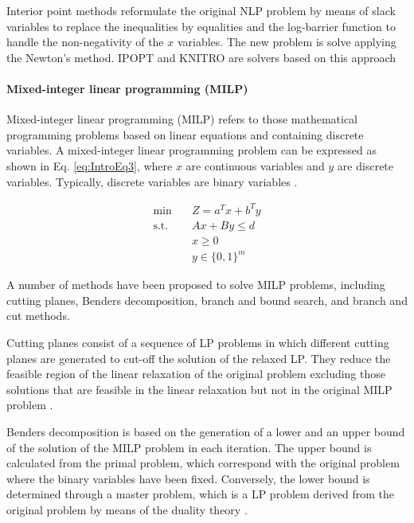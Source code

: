 \begin{refsection}[referencesCh1]
Interior point methods reformulate the original NLP problem by means of slack variables to replace the inequalities by equalities and the log-barrier function to handle the non-negativity of the $x$ variables. The new problem is solve applying the Newton's method. IPOPT \citep{wachter2006implementation} and KNITRO \citep{waltz2004knitro} are solvers based on this approach

\paragraph{Mixed-integer linear programming (MILP)}
Mixed-integer linear programming (MILP) refers to those mathematical programming problems based on linear equations and containing discrete variables. A mixed-integer linear programming problem can be expressed as shown in Eq. \ref{eq:IntroEq3}, where $x$ are continuous variables and $y$ are discrete variables. Typically, discrete variables are binary variables \citep{grossmann2021advanced}.

\begin{align}
		\min \quad & Z=a^{T}x + b^{T}y \nonumber\\
		\textrm{s.t.} \quad & Ax+By \leq d \label{eq:IntroEq3}\\
		& x \geq 0 \\
		& y \in \lbrace 0,1 \rbrace ^{m} \nonumber
\end{align}  

A number of methods have been proposed to solve MILP problems, including cutting planes, Benders decomposition, branch and bound search, and branch and cut methods.

Cutting planes consist of a sequence of LP problems in which different cutting planes are generated to cut-off the solution of the relaxed LP. They reduce the feasible region of the linear relaxation of the original problem excluding those solutions that are feasible in the linear relaxation but not in the original MILP problem \citep{floudas1995nonlinear}. 

Benders decomposition is based on the generation of a lower and an upper bound of the solution of the MILP problem in each iteration. The upper bound is calculated from the primal problem, which correspond with the original problem where the binary variables have been fixed. Conversely, the lower bound is determined through a master problem, which is a LP problem derived from the original problem by means of the duality theory \citep{benders1962partitioning}.


\end{refsection}
